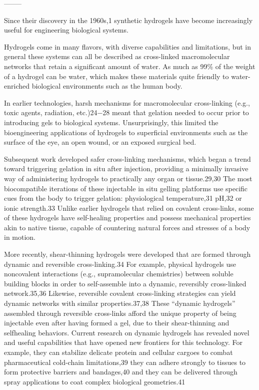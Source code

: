 \documentclass[../../main-notes.tex]{subfiles}
\begin{document}
--------

\citep{correaTranslationalApplicationsHydrogels2021}

Since their discovery in the 1960s,1 synthetic hydrogels have become increasingly useful for engineering biological systems.

Hydrogels come in many flavors, with diverse capabilities and limitations, but in general these systems can all be described as cross-linked macromolecular networks that retain a significant amount of water. 
As much as 99\% of the weight of a hydrogel can be water, which makes these materials quite friendly to water-enriched biological environments such as the human body. 

In earlier technologies, harsh mechanisms for macromolecular cross-linking (e.g., toxic agents, radiation,  etc.)24−28 meant that gelation needed to occur prior to introducing gels to biological systems. 
Unsurprisingly, this limited the bioengineering applications of hydrogels to superficial environments such as the surface of the eye, an open wound, or an exposed surgical bed. 

Subsequent work developed safer cross-linking mechanisms, which began a trend toward triggering gelation in situ after injection, providing a minimally invasive way of administering  hydrogels to practically any organ or tissue.29,30 
The most biocompatible iterations of these injectable in situ gelling platforms use specific cues from the body to trigger gelation:  physiological temperature,31 pH,32 or ionic strength.33 
Unlike earlier hydrogels that relied on covalent cross-links, some of these hydrogels have self-healing properties and possess mechanical properties akin to native tissue, capable of countering natural forces and stresses of a body in motion.


More recently, shear-thinning hydrogels were developed that are formed through dynamic and reversible cross-linking.34 
For example, physical hydrogels use noncovalent interactions (e.g., supramolecular chemistries) between soluble building blocks in order to self-assemble into a dynamic, reversibly cross-linked  network.35,36 
Likewise, reversible covalent cross-linking strategies can yield dynamic networks with similar properties.37,38 
These “dynamic hydrogels” assembled through reversible cross-links afford the unique property of being injectable even after having formed a gel, due to their shear-thinning and selfhealing behaviors. 
Current research on dynamic hydrogels has revealed novel and useful capabilities that have opened new frontiers for this technology. 
For example, they can stabilize delicate protein and cellular cargoes to combat pharmaceutical  cold-chain limitations,39 they can adhere strongly to tissues to  form protective barriers and bandages,40 and they can be delivered through spray applications to coat complex biological  geometries.41
\end{document}
